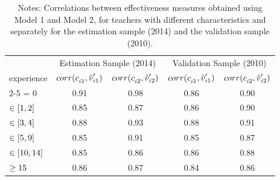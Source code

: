 \documentclass[notitlepage,12pt]{article}%
\begin{document}
\begin{table}[bh]
\caption{Correlation of Teacher Effectiveness between Model 1 and Model 2}%
\label{tab:model1_2}
\begin{center}%
\begin{tabular}
[c]{lcccc}\hline\hline
& \multicolumn{2}{c}{{\small Estimation Sample (2014)}} &
\multicolumn{2}{c}{{\small Validation Sample (2010)}}\\
{\small experience} & ${\small corr(c}_{i1}{\small ,\hat{v}}_{i1}^{\prime
}{\small )}$ & \multicolumn{1}{c|}{${\small corr(c}_{i2}{\small ,\hat{v}}%
_{i2}^{\prime}{\small )}$} & ${\small corr(c}_{i1}{\small ,\hat{v}}%
_{i1}^{\prime}{\small )}$ & ${\small corr(c}_{i2}{\small ,\hat{v}}%
_{i2}^{\prime}{\small )}$\\\cline{2-5}%
{\small = 0} & \multicolumn{1}{c}{{\small 0.91}} & {\small 0.98} &
\multicolumn{1}{|c}{{\small 0.86}} & {\small 0.90}\\
${\small \in\lbrack1,2]}$ & \multicolumn{1}{c}{{\small 0.85}} & {\small 0.87}
& \multicolumn{1}{|c}{{\small 0.86}} & {\small 0.90}\\
${\small \in\lbrack3,4]}$ & \multicolumn{1}{c}{{\small 0.88}} & {\small 0.93}
& \multicolumn{1}{|c}{{\small 0.88}} & {\small 0.91}\\
${\small \in\lbrack5,9]}$ & \multicolumn{1}{c}{{\small 0.85}} & {\small 0.91}
& \multicolumn{1}{|c}{{\small 0.85}} & {\small 0.87}\\
${\small \in\lbrack10,14]}$ & \multicolumn{1}{c}{{\small 0.85}} &
{\small 0.86} & \multicolumn{1}{|c}{{\small 0.86}} & {\small 0.88}\\
${\small \geq15}$ & \multicolumn{1}{c}{{\small 0.86}} & {\small 0.87} &
\multicolumn{1}{|c}{{\small 0.84}} & {\small 0.86}\\\hline\hline
\end{tabular}
\caption*{{\footnotesize Notes: Correlations between effectiveness measures obtained using Model 1 and Model 2, for teachers with different characteristics and separately for the estimation sample (2014) and the validation sample (2010). 
}}\end{center}
\end{table}
\end{document}
